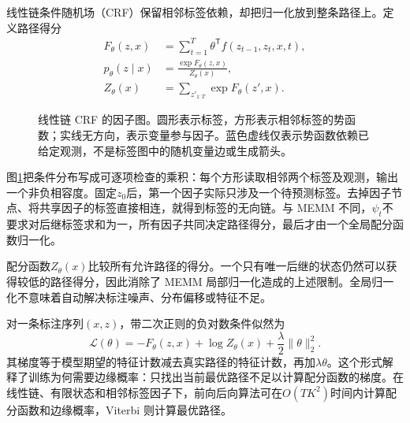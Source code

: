 线性链条件随机场（CRF）保留相邻标签依赖，却把归一化放到整条路径上\cite{murphy2022pml}。定义路径得分
\begin{align}
 F_\theta(z,x)&=\sum_{t=1}^{T}\theta^{\mathsf T}f(z_{t-1},z_t,x,t),\\
 p_\theta(z\mid x)&=\frac{\exp F_\theta(z,x)}{Z_\theta(x)},\\
 Z_\theta(x)&=\sum_{z'_{1:T}}\exp F_\theta(z',x).
\end{align}
\begin{figure}[htbp]
\centering
{}
\caption{线性链 CRF 的因子图。圆形表示标签，方形表示相邻标签的势函数；实线无方向，表示变量参与因子。蓝色虚线仅表示势函数依赖已给定观测，不是标签图中的随机变量边或生成箭头。}
\label{fig:bayes-crf-structure}
\end{figure}
图\ref{fig:bayes-crf-structure}把条件分布写成可逐项检查的乘积：每个方形读取相邻两个标签及观测，输出一个非负相容度。固定$z_0$后，第一个因子实际只涉及一个待预测标签。去掉因子节点、将共享因子的标签直接相连，就得到标签的无向链。与 MEMM 不同，$\psi_t$不要求对后继标签求和为一，所有因子共同决定路径得分，最后才由一个全局配分函数归一化。

配分函数$Z_\theta(x)$比较所有允许路径的得分。一个只有唯一后继的状态仍然可以获得较低的路径得分，因此消除了 MEMM 局部归一化造成的上述限制。全局归一化不意味着自动解决标注噪声、分布偏移或特征不足。

对一条标注序列$(x,z)$，带二次正则的负对数条件似然为
\begin{equation}
 \mathcal L(\theta)=-F_\theta(z,x)+\log Z_\theta(x)
 +\frac{\lambda}{2}\|\theta\|_2^2.
\end{equation}
其梯度等于模型期望的特征计数减去真实路径的特征计数，再加$\lambda\theta$。这个形式解释了训练为何需要边缘概率：只找出当前最优路径不足以计算配分函数的梯度。在线性链、有限状态和相邻标签因子下，前向后向算法可在$O(TK^2)$时间内计算配分函数和边缘概率，Viterbi 则计算最优路径。

